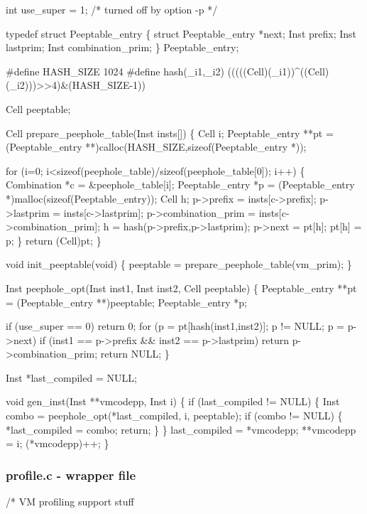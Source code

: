 \documentclass[10pt,english]{article}
\begin{document}
int use_super = 1; /* turned off by option -p */

typedef struct Peeptable_entry \{
  struct Peeptable_entry *next;
  Inst prefix;
  Inst lastprim;
  Inst combination_prim;
\} Peeptable_entry;

#define HASH_SIZE 1024
#define hash(_i1,_i2) (((((Cell)(_i1))^((Cell)(_i2)))>>4)&(HASH_SIZE-1))

Cell peeptable;

Cell prepare_peephole_table(Inst insts[])
\{
  Cell i;
  Peeptable_entry **pt = (Peeptable_entry **)calloc(HASH_SIZE,sizeof(Peeptable_entry *));

  for (i=0; i<sizeof(peephole_table)/sizeof(peephole_table[0]); i++) \{
    Combination *c = &peephole_table[i];
    Peeptable_entry *p = (Peeptable_entry *)malloc(sizeof(Peeptable_entry));
    Cell h;
    p->prefix =           insts[c->prefix];
    p->lastprim =         insts[c->lastprim];
    p->combination_prim = insts[c->combination_prim];
    h = hash(p->prefix,p->lastprim);
    p->next = pt[h];
    pt[h] = p;
  \}
  return (Cell)pt;
\}

void init_peeptable(void)
\{
  peeptable = prepare_peephole_table(vm_prim);
\}

Inst peephole_opt(Inst inst1, Inst inst2, Cell peeptable)
\{
  Peeptable_entry **pt = (Peeptable_entry **)peeptable;
  Peeptable_entry *p;

  if (use_super == 0)
      return 0;
  for (p = pt[hash(inst1,inst2)]; p != NULL; p = p->next)
    if (inst1 == p->prefix && inst2 == p->lastprim)
      return p->combination_prim;
  return NULL;
\}

Inst *last_compiled = NULL;

void gen_inst(Inst **vmcodepp, Inst i)
\{
  if (last_compiled != NULL) \{
    Inst combo = peephole_opt(*last_compiled, i, peeptable);
    if (combo != NULL) \{
      *last_compiled = combo;
      return;
    \}
  \}
  last_compiled = *vmcodepp;
  **vmcodepp = i;
  (*vmcodepp)++;
\}
\nwendcode{}\nwdocspar


\subsubsection{profile.c - wrapper file}

\nwenddocs{}\endmoddef
/* VM profiling support stuff
\end{document}
